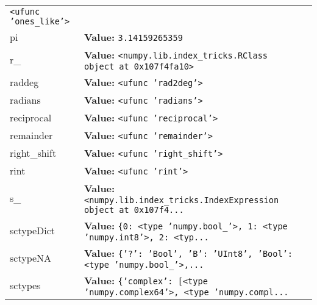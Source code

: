 \begin{longtable}{|p{\varnamewidth}|p{\vardescrwidth}|l}
{\tt {\textless}ufunc 'ones\_like'{\textgreater}}&\\
\cline{1-2}
\raggedright p\-i\- & \raggedright \textbf{Value:} 
{\tt 3.14159265359}&\\
\cline{1-2}
\raggedright r\-\_\- & \raggedright \textbf{Value:} 
{\tt {\textless}numpy.lib.index\_tricks.RClass object at 0x107f4fa10{\textgreater}}&\\
\cline{1-2}
\raggedright r\-a\-d\-2\-d\-e\-g\- & \raggedright \textbf{Value:} 
{\tt {\textless}ufunc 'rad2deg'{\textgreater}}&\\
\cline{1-2}
\raggedright r\-a\-d\-i\-a\-n\-s\- & \raggedright \textbf{Value:} 
{\tt {\textless}ufunc 'radians'{\textgreater}}&\\
\cline{1-2}
\raggedright r\-e\-c\-i\-p\-r\-o\-c\-a\-l\- & \raggedright \textbf{Value:} 
{\tt {\textless}ufunc 'reciprocal'{\textgreater}}&\\
\cline{1-2}
\raggedright r\-e\-m\-a\-i\-n\-d\-e\-r\- & \raggedright \textbf{Value:} 
{\tt {\textless}ufunc 'remainder'{\textgreater}}&\\
\cline{1-2}
\raggedright r\-i\-g\-h\-t\-\_\-s\-h\-i\-f\-t\- & \raggedright \textbf{Value:} 
{\tt {\textless}ufunc 'right\_shift'{\textgreater}}&\\
\cline{1-2}
\raggedright r\-i\-n\-t\- & \raggedright \textbf{Value:} 
{\tt {\textless}ufunc 'rint'{\textgreater}}&\\
\cline{1-2}
\raggedright s\-\_\- & \raggedright \textbf{Value:} 
{\tt {\textless}numpy.lib.index\_tricks.IndexExpression object at 0x107f4\texttt{...}}&\\
\cline{1-2}
\raggedright s\-c\-t\-y\-p\-e\-D\-i\-c\-t\- & \raggedright \textbf{Value:} 
{\tt \texttt{\{}0\texttt{: }{\textless}type 'numpy.bool\_'{\textgreater}\texttt{, }1\texttt{: }{\textless}type 'numpy.int8'{\textgreater}\texttt{, }2\texttt{: }{\textless}typ\texttt{...}}&\\
\cline{1-2}
\raggedright s\-c\-t\-y\-p\-e\-N\-A\- & \raggedright \textbf{Value:} 
{\tt \texttt{\{}\texttt{'}\texttt{?}\texttt{'}\texttt{: }\texttt{'}\texttt{Bool}\texttt{'}\texttt{, }\texttt{'}\texttt{B}\texttt{'}\texttt{: }\texttt{'}\texttt{UInt8}\texttt{'}\texttt{, }\texttt{'}\texttt{Bool}\texttt{'}\texttt{: }{\textless}type 'numpy.bool\_'{\textgreater}\texttt{,}\texttt{...}}&\\
\cline{1-2}
\raggedright s\-c\-t\-y\-p\-e\-s\- & \raggedright \textbf{Value:} 
{\tt \texttt{\{}\texttt{'}\texttt{complex}\texttt{'}\texttt{: }\texttt{[}{\textless}type 'numpy.complex64'{\textgreater}\texttt{, }{\textless}type 'numpy.compl\texttt{...}}&\\

\end{longtable}
